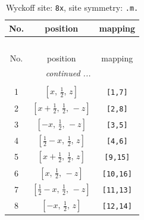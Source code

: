 \documentclass[fleqn,8pt]{jsarticle}
\begin{document}
\begin{longtable}{ccc}
\caption{Wyckoff site: {\tt 8x}, site symmetry: {\tt .m.}}
 \\
 \hline \hline
No. & position & mapping \\ \hline \endfirsthead

\multicolumn{2}{l}{\tablename\ \thetable{}} \\
 \hline \hline
No. & position & mapping \\ \hline \endhead

 \hline \hline
\multicolumn{2}{r}{\footnotesize\it continued ...} \\ \endfoot

 \hline \hline
\multicolumn{2}{r}{} \\ \endlastfoot

1 & $\left[ x,\, \frac{1}{2},\, z \right]$ & {\tt [1,7]} \\ \hline
2 & $\left[ x + \frac{1}{2},\, \frac{1}{2},\, - z \right]$ & {\tt [2,8]} \\ \hline
3 & $\left[ - x,\, \frac{1}{2},\, - z \right]$ & {\tt [3,5]} \\ \hline
4 & $\left[ \frac{1}{2} - x,\, \frac{1}{2},\, z \right]$ & {\tt [4,6]} \\ \hline
5 & $\left[ x + \frac{1}{2},\, \frac{1}{2},\, z \right]$ & {\tt [9,15]} \\ \hline
6 & $\left[ x,\, \frac{1}{2},\, - z \right]$ & {\tt [10,16]} \\ \hline
7 & $\left[ \frac{1}{2} - x,\, \frac{1}{2},\, - z \right]$ & {\tt [11,13]} \\ \hline
8 & $\left[ - x,\, \frac{1}{2},\, z \right]$ & {\tt [12,14]} \\
\end{longtable}
\renewcommand{\arraystretch}{1.2}
\end{document}
